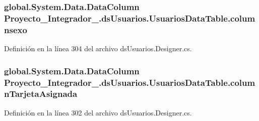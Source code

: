 \hypertarget{class_proyecto___integrador__3_1_1ds_usuarios_1_1_usuarios_data_table_ad45685f78c3413cf452abd3daff0df06}{
\subsubsection[{columnsexo}]{\setlength{\rightskip}{0pt plus 5cm}global.\-System.\-Data.\-Data\-Column Proyecto\-\_\-\-Integrador\-\_.\-ds\-Usuarios.\-Usuarios\-Data\-Table.\-columnsexo\hspace{0.3cm}{\ttfamily [private]}}}\label{class_proyecto___integrador__3_1_1ds_usuarios_1_1_usuarios_data_table_ad45685f78c3413cf452abd3daff0df06}


Definición en la línea 304 del archivo ds\-Usuarios.\-Designer.\-cs.

\hypertarget{class_proyecto___integrador__3_1_1ds_usuarios_1_1_usuarios_data_table_a504be60e812d907c7136a5e3851d016b}{
\subsubsection[{column\-Tarjeta\-Asignada}]{\setlength{\rightskip}{0pt plus 5cm}global.\-System.\-Data.\-Data\-Column Proyecto\-\_\-\-Integrador\-\_.\-ds\-Usuarios.\-Usuarios\-Data\-Table.\-column\-Tarjeta\-Asignada\hspace{0.3cm}{\ttfamily [private]}}}\label{class_proyecto___integrador__3_1_1ds_usuarios_1_1_usuarios_data_table_a504be60e812d907c7136a5e3851d016b}


Definición en la línea 302 del archivo ds\-Usuarios.\-Designer.\-cs.

